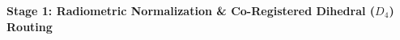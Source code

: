 \documentclass[preview]{standalone}
\begin{document}
\begin{center}
\textbf{Stage 1: Radiometric Normalization \& Co-Registered Dihedral ($D_4$) Routing}
\end{center}
\end{document}
